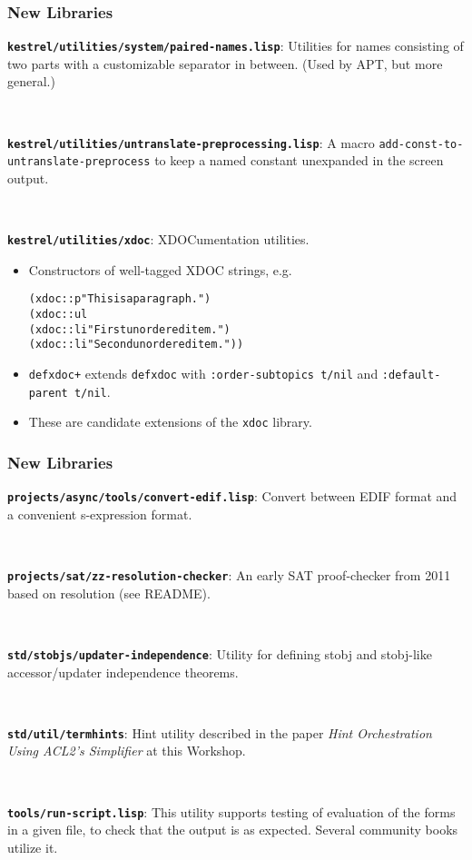 \documentclass{beamer}
\newcommand{\code}[1]{\texttt{#1}}
\newenvironment{codeblock}{\begin{alltt}}{\end{alltt}}
\newcommand{\bookpath}[1]{\textbf{\code{#1}}}
\newcommand{\newlibtitle}{\frametitle{New Libraries}}
\begin{document}

\begin{frame}[fragile]

\newlibtitle

\bookpath{kestrel/utilities/system/paired-names.lisp}:
Utilities for names consisting of
two parts with a customizable separator in between.
(Used by APT, but more general.)

\

\bookpath{kestrel/utilities/untranslate-preprocessing.lisp}:
A macro \code{add-const-to-untranslate-preprocess}
to keep a named constant unexpanded in the screen output.

\

\bookpath{kestrel/utilities/xdoc}:
XDOCumentation utilities.
\begin{itemize}
\item
Constructors of well-tagged XDOC strings, e.g.
\begin{codeblock}
(xdoc::p "This is a paragraph.")
(xdoc::ul
  (xdoc::li "First unordered item.")
  (xdoc::li "Second unordered item."))
\end{codeblock}
\item
\code{defxdoc+} extends \code{defxdoc} with
\code{:order-subtopics t/nil} and \code{:default-parent t/nil}.
\item
These are candidate extensions of the \code{xdoc} library.
\end{itemize}

\end{frame}


\begin{frame}

\newlibtitle

\bookpath{projects/async/tools/convert-edif.lisp}:
Convert between EDIF format and a convenient s-expression format.

\

\bookpath{projects/sat/zz-resolution-checker}:
An early SAT proof-checker from 2011 based on resolution (see README).

\

\bookpath{std/stobjs/updater-independence}:
Utility for defining stobj and stobj-like accessor/updater
independence theorems.

\

\bookpath{std/util/termhints}:
Hint utility described in the paper
\textit{Hint Orchestration Using ACL2's Simplifier}
at this Workshop.

\

\bookpath{tools/run-script.lisp}:
This utility supports testing of evaluation of the forms
in a given file, to check that the output is as expected.
Several community books utilize it.

\end{frame}
\end{document}

